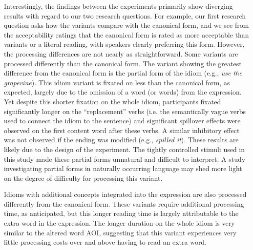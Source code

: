 \documentclass[output=paper,modfonts,nonflat]{langsci/langscibook}
\begin{document}
Interestingly, the findings between the experiments primarily show diverging results with regard to our two research questions. For example, our first research question asks how the variants compare with the canonical form, and we see from the acceptability ratings that the canonical form is rated as more acceptable than variants or a literal reading, with speakers clearly preferring this form. However, the processing differences are not nearly as straightforward. Some variants are processed differently than the canonical form. The variant showing the greatest difference from the canonical form is the partial form of the idiom (e.g., \textit{use the grapevine}). This idiom variant is fixated on less than the canonical form, as expected, largely due to the omission of a word (or words) from the expression. Yet despite this shorter fixation on the whole idiom, participants fixated significantly longer on the ``replacement'' verbs (i.e. the semantically vague verbs used to connect the idiom to the sentence) and significant spillover effects were observed on the first content word after these verbs. A similar inhibitory effect was not observed if the ending was modified (e.g., \textit{spilled it}). These results are likely due to the design of the experiment. The tightly controlled stimuli used in this study made these partial forms unnatural and difficult to interpret. A study investigating partial forms in naturally occurring language may shed more light on the degree of difficulty for processing this variant.

Idioms with additional concepts integrated into the expression are also processed differently from the canonical form. These variants require additional processing time, as anticipated, but this longer reading time is largely attributable to the extra word in the expression. The longer duration on the whole idiom is very similar to the altered word AOI, suggesting that this variant experiences very little processing costs over and above having to read an extra word.
 
\end{document}
